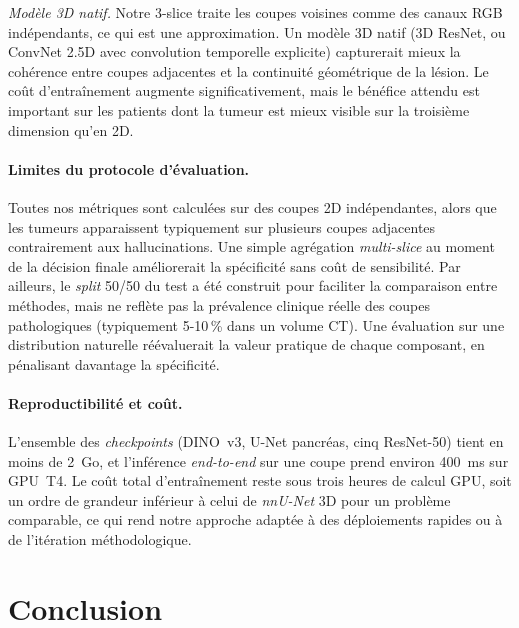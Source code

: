 \documentclass{article}
\begin{document}
\emph{Mod\`ele 3D natif.} Notre 3-slice traite les coupes voisines comme des
canaux RGB ind\'ependants, ce qui est une approximation. Un mod\`ele 3D natif
(3D ResNet, ou ConvNet 2.5D avec convolution temporelle explicite) capturerait
mieux la coh\'erence entre coupes adjacentes et la continuit\'e g\'eom\'etrique
de la l\'esion. Le co\^ut d'entra\^inement augmente significativement, mais
le b\'en\'efice attendu est important sur les patients dont la tumeur est
mieux visible sur la troisi\`eme dimension qu'en 2D.

\paragraph{Limites du protocole d'\'evaluation.}
Toutes nos m\'etriques sont calcul\'ees sur des coupes 2D ind\'ependantes,
alors que les tumeurs apparaissent typiquement sur plusieurs coupes
adjacentes contrairement aux hallucinations. Une simple agr\'egation
\emph{multi-slice} au moment de la d\'ecision finale am\'eliorerait la
sp\'ecificit\'e sans co\^ut de sensibilit\'e. Par ailleurs, le \emph{split}
50/50 du test a \'et\'e construit pour faciliter la comparaison entre
m\'ethodes, mais ne refl\`ete pas la pr\'evalence clinique r\'eelle des coupes
pathologiques (typiquement 5-10\,\% dans un volume CT). Une \'evaluation sur
une distribution naturelle r\'e\'evaluerait la valeur pratique de chaque
composant, en p\'enalisant davantage la sp\'ecificit\'e.

\paragraph{Reproductibilit\'e et co\^ut.}
L'ensemble des \emph{checkpoints} (DINO~v3, U-Net pancr\'eas, cinq ResNet-50)
tient en moins de 2~Go, et l'inf\'erence \emph{end-to-end} sur une coupe
prend environ 400~ms sur GPU~T4. Le co\^ut total d'entra\^inement reste sous
trois heures de calcul GPU, soit un ordre de grandeur inf\'erieur \`a celui
de \emph{nnU-Net} 3D pour un probl\`eme comparable, ce qui rend notre approche
adapt\'ee \`a des d\'eploiements rapides ou \`a de l'it\'eration
m\'ethodologique.

\section{Conclusion}
\end{document}
